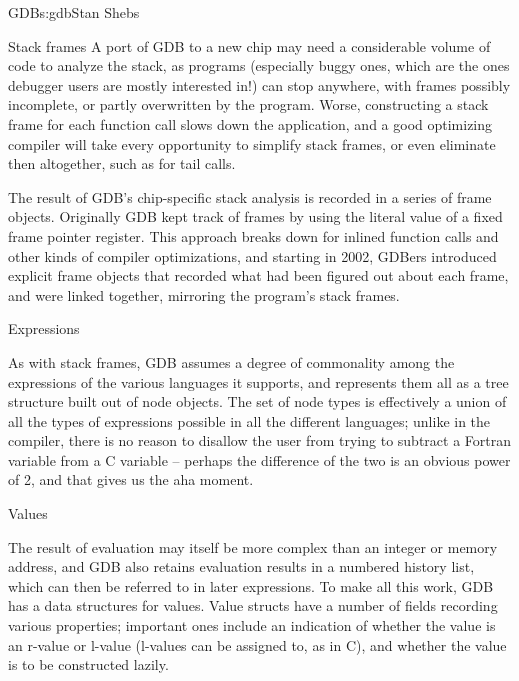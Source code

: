 \begin{aosachapter}{GDB}{s:gdb}{Stan Shebs}
\begin{aosasect2}{Stack frames}
A port of GDB to a new chip may need a considerable volume of code to
analyze the stack, as programs (especially buggy ones, which are the
ones debugger users are mostly interested in!) can stop anywhere, with
frames possibly incomplete, or partly overwritten by the program.
Worse, constructing a stack frame for each function call slows down the
application, and a good optimizing compiler will take every
opportunity to simplify stack frames, or even eliminate then
altogether, such as for tail calls.

The result of GDB's chip-specific stack analysis is recorded in a
series of frame objects.  Originally GDB kept track of frames by using
the literal value of a fixed frame pointer register.  This approach
breaks down for inlined function calls and other kinds of compiler
optimizations, and starting in 2002, GDBers introduced explicit frame
objects that recorded what had been figured out about each frame, and
were linked together, mirroring the program's stack frames.

\end{aosasect2}

\begin{aosasect2}{Expressions}

As with stack frames, GDB assumes a degree of commonality among the
expressions of the various languages it supports, and represents them
all as a tree structure built out of node objects.  The set of node
types is effectively a union of all the types of expressions possible
in all the different languages; unlike in the compiler, there is no
reason to disallow the user from trying to subtract a Fortran variable
from a C variable -- perhaps the difference of the two is an obvious
power of 2, and that gives us the aha moment.

\end{aosasect2}

\begin{aosasect2}{Values}

The result of evaluation may itself be more complex than an integer or
memory address, and GDB also retains evaluation results in a numbered
history list, which can then be referred to in later expressions.  To
make all this work, GDB has a data structures for values.  Value
structs have a number of fields recording various properties;
important ones include an indication of whether the value is an
r-value or l-value (l-values can be assigned to, as in C), and whether
the value is to be constructed lazily.

\end{aosasect2}


\end{aosachapter}
